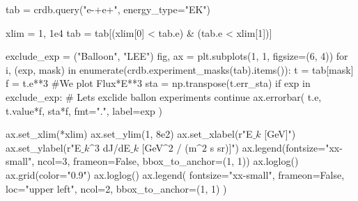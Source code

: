 \documentclass[
  letterpaper,
  DIV=11,
  numbers=noendperiod]{scrreprt}
\newenvironment{Shaded}{\begin{snugshade}}{\end{snugshade}}
\newcommand{\BuiltInTok}[1]{\textcolor[rgb]{0.00,0.23,0.31}{#1}}
\newcommand{\CommentTok}[1]{\textcolor[rgb]{0.37,0.37,0.37}{#1}}
\newcommand{\ControlFlowTok}[1]{\textcolor[rgb]{0.00,0.23,0.31}{#1}}
\newcommand{\DecValTok}[1]{\textcolor[rgb]{0.68,0.00,0.00}{#1}}
\newcommand{\FloatTok}[1]{\textcolor[rgb]{0.68,0.00,0.00}{#1}}
\newcommand{\KeywordTok}[1]{\textcolor[rgb]{0.00,0.23,0.31}{#1}}
\newcommand{\NormalTok}[1]{\textcolor[rgb]{0.00,0.23,0.31}{#1}}
\newcommand{\OperatorTok}[1]{\textcolor[rgb]{0.37,0.37,0.37}{#1}}
\newcommand{\StringTok}[1]{\textcolor[rgb]{0.13,0.47,0.30}{#1}}
\newcommand{\VariableTok}[1]{\textcolor[rgb]{0.07,0.07,0.07}{#1}}
\newcommand{\VerbatimStringTok}[1]{\textcolor[rgb]{0.13,0.47,0.30}{#1}}
\begin{document}
\begin{Shaded}
\begin{Highlighting}[]
\NormalTok{tab }\OperatorTok{=}\NormalTok{ crdb.query(}\StringTok{"e{-}+e+"}\NormalTok{, energy\_type}\OperatorTok{=}\StringTok{"EK"}\NormalTok{)}

\NormalTok{xlim }\OperatorTok{=} \DecValTok{1}\NormalTok{, }\FloatTok{1e4}
\NormalTok{tab }\OperatorTok{=}\NormalTok{ tab[(xlim[}\DecValTok{0}\NormalTok{] }\OperatorTok{\textless{}}\NormalTok{ tab.e) }\OperatorTok{\&}\NormalTok{ (tab.e }\OperatorTok{\textless{}}\NormalTok{ xlim[}\DecValTok{1}\NormalTok{])]}

\NormalTok{exclude\_exp }\OperatorTok{=}\NormalTok{ (}\StringTok{"Balloon"}\NormalTok{, }\StringTok{"LEE"}\NormalTok{)}
\NormalTok{fig, ax }\OperatorTok{=}\NormalTok{ plt.subplots(}\DecValTok{1}\NormalTok{, }\DecValTok{1}\NormalTok{, figsize}\OperatorTok{=}\NormalTok{(}\DecValTok{6}\NormalTok{, }\DecValTok{4}\NormalTok{))}
\ControlFlowTok{for}\NormalTok{ i, (exp, mask) }\KeywordTok{in} \BuiltInTok{enumerate}\NormalTok{(crdb.experiment\_masks(tab).items()):}
\NormalTok{    t }\OperatorTok{=}\NormalTok{ tab[mask]}
\NormalTok{    f }\OperatorTok{=}\NormalTok{ t.e}\OperatorTok{**}\DecValTok{3} \CommentTok{\#We plot Flux*E**3}
\NormalTok{    sta }\OperatorTok{=}\NormalTok{ np.transpose(t.err\_sta)}
    \ControlFlowTok{if}\NormalTok{ exp }\KeywordTok{in}\NormalTok{ exclude\_exp: }\CommentTok{\# Let\textquotesingle{}s exclide ballon experiments}
        \ControlFlowTok{continue}
\NormalTok{    ax.errorbar(}
\NormalTok{        t.e, t.value}\OperatorTok{*}\NormalTok{f, sta}\OperatorTok{*}\NormalTok{f, fmt}\OperatorTok{=}\StringTok{"."}\NormalTok{, label}\OperatorTok{=}\NormalTok{exp}
\NormalTok{    )}

\NormalTok{ax.set\_xlim(}\OperatorTok{*}\NormalTok{xlim)}
\NormalTok{ax.set\_ylim(}\DecValTok{1}\NormalTok{, }\FloatTok{8e2}\NormalTok{)}
\NormalTok{ax.set\_xlabel(}\VerbatimStringTok{r"E$\_k$ [GeV]"}\NormalTok{)}
\NormalTok{ax.set\_ylabel(}\VerbatimStringTok{r"E$\_k\^{}3$ dJ/dE$\_k$ [GeV$\^{}2$ / (m$\^{}2$ s sr)]"}\NormalTok{)}
\NormalTok{ax.legend(fontsize}\OperatorTok{=}\StringTok{"xx{-}small"}\NormalTok{, ncol}\OperatorTok{=}\DecValTok{3}\NormalTok{, frameon}\OperatorTok{=}\VariableTok{False}\NormalTok{, bbox\_to\_anchor}\OperatorTok{=}\NormalTok{(}\DecValTok{1}\NormalTok{, }\DecValTok{1}\NormalTok{))}
\NormalTok{ax.loglog()}
\NormalTok{ax.grid(color}\OperatorTok{=}\StringTok{"0.9"}\NormalTok{)}
\NormalTok{ax.loglog()}
\NormalTok{ax.legend(}
\NormalTok{    fontsize}\OperatorTok{=}\StringTok{"xx{-}small"}\NormalTok{, frameon}\OperatorTok{=}\VariableTok{False}\NormalTok{, loc}\OperatorTok{=}\StringTok{"upper left"}\NormalTok{, ncol}\OperatorTok{=}\DecValTok{2}\NormalTok{, bbox\_to\_anchor}\OperatorTok{=}\NormalTok{(}\DecValTok{1}\NormalTok{, }\DecValTok{1}\NormalTok{)}
\NormalTok{)}
\end{Highlighting}
\end{Shaded}
\end{document}

